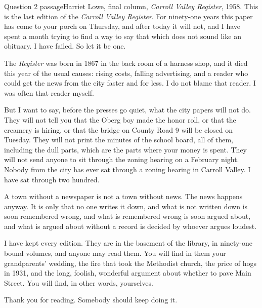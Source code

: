 \documentclass[11pt]{article}
\begin{document}
\begin{passage}{Question 2 passage}{Harriet Lowe, final column, \emph{Carroll Valley Register}, 1958.}
 This is the last edition of the \emph{Carroll Valley Register}. For ninety-one years this paper has come to your porch on Thursday, and after today it will not, and I have spent a month trying to find a way to say that which does not sound like an obituary. I have failed. So let it be one.

 The \emph{Register} was born in 1867 in the back room of a harness shop, and it died this year of the usual causes: rising costs, falling advertising, and a reader who could get the news from the city faster and for less. I do not blame that reader. I was often that reader myself.

 But I want to say, before the presses go quiet, what the city papers will not do. They will not tell you that the Oberg boy made the honor roll, or that the creamery is hiring, or that the bridge on County Road 9 will be closed on Tuesday. They will not print the minutes of the school board, all of them, including the dull parts, which are the parts where your money is spent. They will not send anyone to sit through the zoning hearing on a February night. Nobody from the city has ever sat through a zoning hearing in Carroll Valley. I have sat through two hundred.

 A town without a newspaper is not a town without news. The news happens anyway. It is only that no one writes it down, and what is not written down is soon remembered wrong, and what is remembered wrong is soon argued about, and what is argued about without a record is decided by whoever argues loudest.

 I have kept every edition. They are in the basement of the library, in ninety-one bound volumes, and anyone may read them. You will find in them your grandparents' wedding, the fire that took the Methodist church, the price of hogs in 1931, and the long, foolish, wonderful argument about whether to pave Main Street. You will find, in other words, yourselves.

 Thank you for reading. Somebody should keep doing it.
\end{passage}

\makekey
\end{document}
